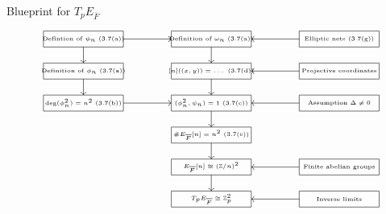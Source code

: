\documentclass[10pt]{beamer}
\begin{document}
\begin{frame}[t]{Blueprint for $ T_pE_{\overline{F}} $}

$$
\begin{tikzpicture}
\draw (0, 0) rectangle node{\tiny Defintion of $ \psi_n $ (3.7(a))} (2.5, -0.5);
\draw [->] (2.5, -0.25) -- (4, -0.25);
\draw [->] (1.25, -0.5) -- (1.25, -1);
\draw (0, -1) rectangle node{\tiny Definition of $ \phi_n $ (3.7(a))} (2.5, -1.5);
\draw [->] (1.25, -1.5) -- (1.25, -2);
\draw (0, -2) rectangle node{\tiny $ \deg(\phi_n^2) = n^2 $ (3.7(b))} (2.5, -2.5);
\draw [->] (2.5, -2.25) -- (4, -2.25);
\draw (4, 0) rectangle node{\tiny Definition of $ \omega_n $ (3.7(a))} (6.5, -0.5);
\draw [->] (5.25, -0.5) -- (5.25, -1);
\draw (4, -1) rectangle node{\tiny $ [n]((x, y)) = \dots $ (3.7(d))} (6.5, -1.5);
\draw [->] (5.25, -1.5) -- (5.25, -2);
\draw (4, -2) rectangle node{\tiny $ (\phi_n^2, \psi_n) = 1 $ (3.7(c))} (6.5, -2.5);
\draw [->] (5.25, -2.5) -- (5.25, -3);
\draw (4, -3) rectangle node{\tiny $ \#E_{\overline{F}}[n] = n^2 $ (3.7(e))} (6.5, -3.5);
\draw [->] (5.25, -3.5) -- (5.25, -4);
\draw (4, -4) rectangle node{\tiny $ E_{\overline{F}}[n] \cong (\mathbb{Z} / n)^2 $} (6.5, -4.5);
\draw [->] (5.25, -4.5) -- (5.25, -5);
\draw (4, -5) rectangle node{\tiny $ T_pE_{\overline{F}} \cong \mathbb{Z}_p^2 $} (6.5, -5.5);
\draw (8, 0) rectangle node{\tiny Elliptic nets (3.7(g))} (10.5, -0.5);
\draw [->] (8, -0.25) -- (6.5, -0.25);
\draw (8, -1) rectangle node{\tiny Projective coordinates} (10.5, -1.5);
\draw [->] (8, -1.25) -- (6.5, -1.25);
\draw (8, -2) rectangle node{\tiny Assumption $ \Delta \ne 0 $} (10.5, -2.5);
\draw [->] (8, -2.25) -- (6.5, -2.25);
\draw (8, -4) rectangle node{\tiny Finite abelian groups} (10.5, -4.5);
\draw [->] (8, -4.25) -- (6.5, -4.25);
\draw (8, -5) rectangle node{\tiny Inverse limits} (10.5, -5.5);
\draw [->] (8, -5.25) -- (6.5, -5.25);
\end{tikzpicture}
$$

\end{frame}
\end{document}
